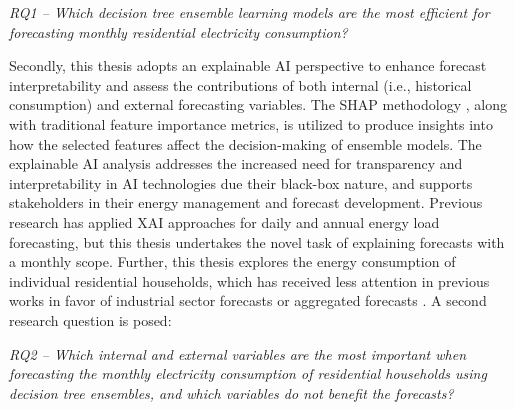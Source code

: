\emph{RQ1 – Which decision tree ensemble learning models are the most efficient for forecasting monthly residential electricity consumption?}


Secondly, this thesis adopts an explainable AI perspective to enhance forecast interpretability and assess the contributions of both internal (i.e., historical consumption) and external forecasting variables. The SHAP methodology \cite{lundberg_unified_2017}, along with traditional feature importance metrics, is utilized to produce insights into how the selected features affect the decision-making of ensemble models. The explainable AI analysis addresses the increased need for transparency and interpretability in AI technologies due their black-box nature, and supports stakeholders in their energy management and forecast development. Previous research has applied XAI approaches for daily and annual energy load forecasting, but this thesis undertakes the novel task of explaining forecasts with a monthly scope. Further, this thesis explores the energy consumption of individual residential households, which has received less attention in previous works in favor of industrial sector forecasts or aggregated forecasts \cite{lazzari_user_2022,nti_electricity_2020}. A second research question is posed:

\emph{RQ2 – Which internal and external variables are the most important when forecasting the monthly electricity consumption of residential households using decision tree ensembles, and which variables do not benefit the forecasts?}

